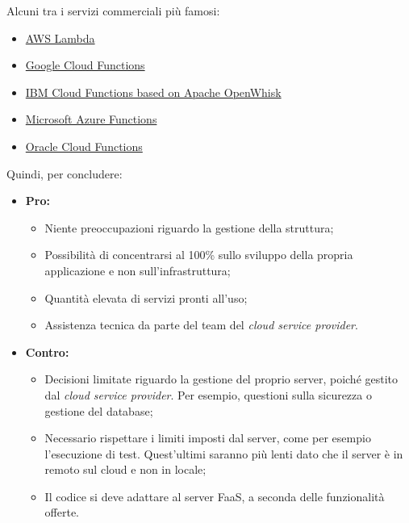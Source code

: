 \documentclass[a4paper]{article}
\begin{document}
	\noindent
	Alcuni tra i servizi commerciali più famosi:
	\begin{itemize}
		\item \href{https://aws.amazon.com/it/lambda/}{AWS Lambda}
		
		\item \href{https://cloud.google.com/functions?hl=it}{Google Cloud Functions}
		
		\item \href{https://www.ibm.com/it-it/cloud/functions}{IBM Cloud Functions based on Apache OpenWhisk}
		
		\item \href{https://azure.microsoft.com/it-it/products/functions/?ef_id=_k_064f86cb83d914979a22e2a5f86f67bb_k_&OCID=AIDcmmy6frl1tq_SEM__k_064f86cb83d914979a22e2a5f86f67bb_k_&msclkid=064f86cb83d914979a22e2a5f86f67bb}{Microsoft Azure Functions}
		
		\item \href{https://www.oracle.com/cloud/cloud-native/functions/}{Oracle Cloud Functions}
	\end{itemize}
	Quindi, per concludere:
	\begin{itemize}
		\item \textcolor{Green4}{\textbf{Pro:}}
		\begin{itemize}
			\item Niente preoccupazioni riguardo la gestione della struttura;
		
			\item Possibilità di concentrarsi al 100\% sullo sviluppo della propria applicazione e non sull'infrastruttura;
		
			\item Quantità elevata di servizi pronti all'uso;
		
			\item Assistenza tecnica da parte del team del \emph{cloud service provider}.
		\end{itemize}
		
		\item \textcolor{Red3}{\textbf{Contro:}}
		\begin{itemize}
			\item Decisioni limitate riguardo la gestione del proprio server, poiché gestito dal \emph{cloud service provider}. Per esempio, questioni sulla sicurezza o gestione del database;
			
			\item Necessario rispettare i limiti imposti dal server, come per esempio l'esecuzione di test. Quest'ultimi saranno più lenti dato che il server è in remoto sul cloud e non in locale;
			
			\item Il codice si deve adattare al server FaaS, a seconda delle funzionalità offerte.
		\end{itemize}
	\end{itemize}\newpage
	
\end{document}
